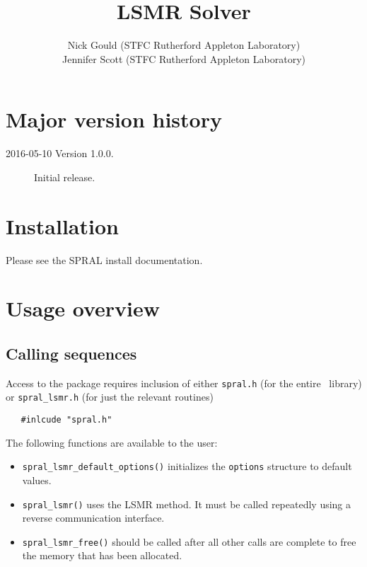 \title{LSMR Solver}
\author{
   Nick Gould (STFC Rutherford Appleton Laboratory) \\
   Jennifer Scott (STFC Rutherford Appleton Laboratory)
}
\spralmaketitle
\thispagestyle{firststyle}

\newpage
\section*{Major version history}
\begin{description}
\item[2016-05-10 Version 1.0.0.] Initial release.
\end{description}


\section{Installation}
Please see the SPRAL install documentation. 


\section{Usage overview}

\subsection{Calling sequences}

Access to the package requires inclusion of either \texttt{spral.h} (for the
entire \spral\ library) or \texttt{spral\_lsmr.h} (for just the relevant routines)

\begin{verbatim}
   #inlcude "spral.h"
\end{verbatim}

\medskip

\noindent
The following functions are available to the user:
\begin{itemize}
\item {\tt spral\_lsmr\_default\_options()} initializes the \texttt{options}
   structure to default values.
\item {\tt spral\_lsmr()} uses the LSMR method. It must be called repeatedly
   using a reverse communication interface.
\item {\tt spral\_lsmr\_free()} should be called after all other calls are
   complete to free the memory that has been allocated. 
\end{itemize}


